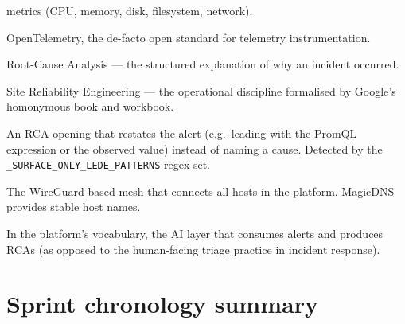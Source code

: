 \documentclass[11pt,a4paper,oneside]{report}
\begin{document}
\begin{description}
    metrics (CPU, memory, disk, filesystem, network).
\item[OTel] OpenTelemetry, the de-facto open standard for telemetry
    instrumentation.
\item[RCA] Root-Cause Analysis --- the structured explanation of why
    an incident occurred.
\item[SRE] Site Reliability Engineering --- the operational discipline
    formalised by Google's homonymous book and workbook.
\item[Surface-only LEDE] An RCA opening that restates the alert (e.g.\
    leading with the PromQL expression or the observed value)
    instead of naming a cause.  Detected by the
    \texttt{\_SURFACE\_ONLY\_LEDE\_PATTERNS} regex set.
\item[Tailscale tailnet] The WireGuard-based mesh that connects all
    hosts in the platform.  MagicDNS provides stable host names.
\item[Triage] In the platform's vocabulary, the AI layer that consumes
    alerts and produces RCAs (as opposed to the human-facing
    triage practice in incident response).
\end{description}

\chapter{Sprint chronology summary}
\label{app:sprint-summary}
\end{document}
